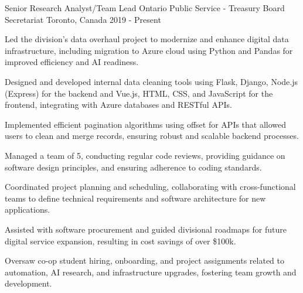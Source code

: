 

\begin{cventries}

\cventry
  {Senior Research Analyst/Team Lead}
  {Ontario Public Service - Treasury Board Secretariat}
  {Toronto, Canada}
  {2019 - Present}
  {
    \begin{cvitems}
      \item Led the division's data overhaul project to modernize and enhance digital data infrastructure, including migration to Azure cloud using Python and Pandas for improved efficiency and AI readiness.
      \item Designed and developed internal data cleaning tools using Flask, Django, Node.js (Express) for the backend and Vue.js, HTML, CSS, and JavaScript for the frontend, integrating with Azure databases and RESTful APIs.
      \item Implemented efficient pagination algorithms using offset for APIs that allowed users to clean and merge records, ensuring robust and scalable backend processes.
      \item Managed a team of 5, conducting regular code reviews, providing guidance on software design principles, and ensuring adherence to coding standards.
      \item Coordinated project planning and scheduling, collaborating with cross-functional teams to define technical requirements and software architecture for new applications.
      \item Assisted with software procurement and guided divisional roadmaps for future digital service expansion, resulting in cost savings of over \$100k.
      \item Oversaw co-op student hiring, onboarding, and project assignments related to automation, AI research, and infrastructure upgrades, fostering team growth and development.
    \end{cvitems}
  }


\end{cventries}
